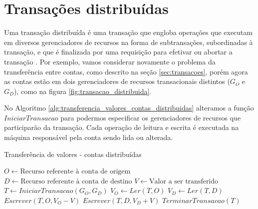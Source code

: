 \documentclass[11pt,twoside,a4paper]{book}
\begin{document}

\section{Transações distribuídas}
\label{sec:transacoes_distribuidas}

Uma transação distribuída é uma transação que engloba operações que executam em diversos gerenciadores de recursos na forma de subtransações, subordinadas à transação, e que é finalizada por uma requisição para efetivar ou abortar a transação \cite{gray-lamport}. Por exemplo, vamos considerar novamente o problema da transferência entre contas, como descrito na seção \ref{sec:transacoes}, porém agora as contas estão em dois gerenciadores de recursos transacionais distintos ($G_O$ e $G_D$), como na figura \ref{fig:transacao_distribuida}. 


No Algoritmo \ref{alg:transferencia_valores_contas_distribuidas} alteramos a função $IniciarTransacao$ para podermos especificar os gerenciadores de recursos que participarão da transação. Cada operação de leitura e escrita é executada na máquina responsável pela conta sendo lida ou alterada.

\begin{algorithm}
\caption{Transferência de valores - contas distribuídas}
\label{alg:transferencia_valores_contas_distribuidas}
\begin{algorithmic}[1]
\State $O \gets \text{Recurso referente à conta de origem}$
\State $D \gets \text{Recurso referente à conta de destino}$
\State $V \gets \text{Valor a ser transferido}$
\State $T \gets IniciarTransacao(G_O, G_D)$
\State $V_O \gets Ler(T, O)$
    \State $V_D \gets Ler(T, D)$
    \State $Escrever(T, O, V_O - V)$
    \State $Escrever(T, D, V_D + V)$
\EndIf
\State $TerminarTransacao(T)$
\end{algorithmic}
\end{algorithm}
\end{document}
